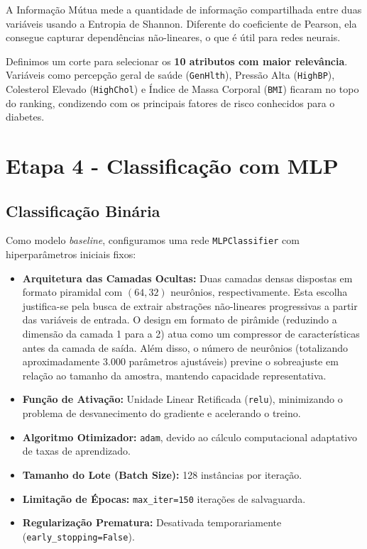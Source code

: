 \documentclass[12pt,a4paper]{article}
\begin{document}
A Informação Mútua mede a quantidade de informação compartilhada entre duas variáveis usando a Entropia de Shannon. Diferente do coeficiente de Pearson, ela consegue capturar dependências não-lineares, o que é útil para redes neurais.

Definimos um corte para selecionar os \textbf{10 atributos com maior relevância}. Variáveis como percepção geral de saúde (\texttt{GenHlth}), Pressão Alta (\texttt{HighBP}), Colesterol Elevado (\texttt{HighChol}) e Índice de Massa Corporal (\texttt{BMI}) ficaram no topo do ranking, condizendo com os principais fatores de risco conhecidos para o diabetes.

\section{Etapa 4 - Classificação com MLP}

\subsection{Classificação Binária}
Como modelo \textit{baseline}, configuramos uma rede \texttt{MLPClassifier} com hiperparâmetros iniciais fixos:
\begin{itemize}
    \item \textbf{Arquitetura das Camadas Ocultas:} Duas camadas densas dispostas em formato piramidal com $(64, 32)$ neurônios, respectivamente. Esta escolha justifica-se pela busca de extrair abstrações não-lineares progressivas a partir das variáveis de entrada. O design em formato de pirâmide (reduzindo a dimensão da camada 1 para a 2) atua como um compressor de características antes da camada de saída. Além disso, o número de neurônios (totalizando aproximadamente 3.000 parâmetros ajustáveis) previne o sobreajuste em relação ao tamanho da amostra, mantendo capacidade representativa.
    \item \textbf{Função de Ativação:} Unidade Linear Retificada (\texttt{relu}), minimizando o problema de desvanecimento do gradiente e acelerando o treino.
    \item \textbf{Algoritmo Otimizador:} \texttt{adam}, devido ao cálculo computacional adaptativo de taxas de aprendizado.
    \item \textbf{Tamanho do Lote (Batch Size):} 128 instâncias por iteração.
    \item \textbf{Limitação de Épocas:} \texttt{max\_iter=150} iterações de salvaguarda.
    \item \textbf{Regularização Prematura:} Desativada temporariamente (\texttt{early\_stopping=False}).
\end{itemize}
\end{document}
